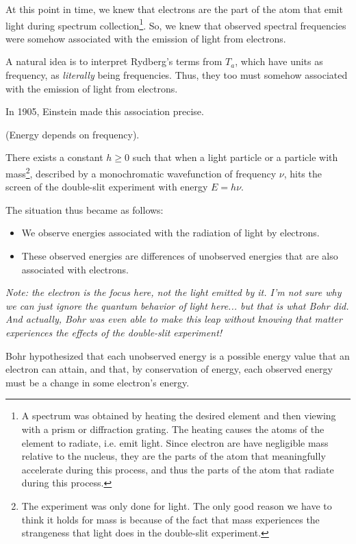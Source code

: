 \documentclass{article}
\begin{document}
At this point in time, we knew that electrons are the part of the atom that emit light during spectrum collection\footnote{A spectrum was obtained by heating the desired element and then viewing with a prism or diffraction grating. The heating causes the atoms of the element to radiate, i.e. emit light. Since electron are have negligible mass relative to the nucleus, they are the parts of the atom that meaningfully accelerate during this process, and thus the parts of the atom that radiate during this process.}. So, we knew that observed spectral frequencies were somehow associated with the emission of light from electrons.

A natural idea is to interpret Rydberg's terms from $T_a$, which have units as frequency, as \textit{literally} being frequencies. Thus, they too must somehow associated with the emission of light from electrons.

In 1905, Einstein made this association precise.

\begin{axiom}
	(Energy depends on frequency).
	
	There exists a constant $h \geq 0$ such that when a light particle or a particle with mass\footnote{The experiment was only done for light. The only good reason we have to think it holds for mass is because of the fact that mass experiences the strangeness that light does in the double-slit experiment.}, described by a monochromatic wavefunction of frequency $\nu$, hits the screen of the double-slit experiment with energy $E = h\nu$.
\end{axiom}

The situation thus became as follows:

\begin{itemize}
	\item We observe energies associated with the radiation of light by electrons. 
	\item These observed energies are differences of unobserved energies that are also associated with electrons.
\end{itemize}

\textit{Note: the electron is the focus here, not the light emitted by it. I'm not sure why we can just ignore the quantum behavior of light here... but that is what Bohr did. And actually, Bohr was even able to make this leap without knowing that matter experiences the effects of the double-slit experiment!}

Bohr hypothesized that each unobserved energy is a possible energy value that an electron can attain, and that, by conservation of energy, each observed energy must be a change in some electron's energy.
\end{document}
